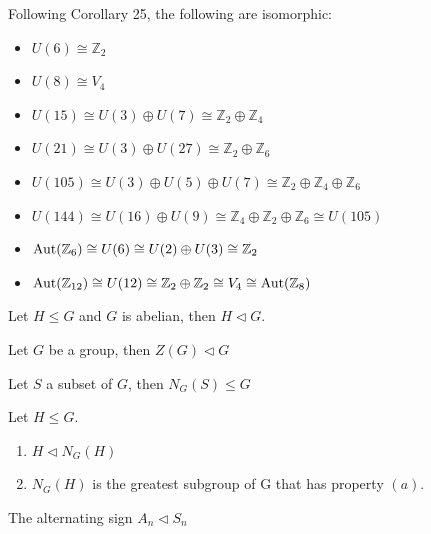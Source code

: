 \begin{assignment}[
  header=HeaderA,
  body=BodyA,
  title={Proved Proposition (Examples) in  Group Theory},
  duedate={\today},
  toc=false,
  toctitle={This appears on the Table of contents.},
  exlist=false
]
\begin{mprop}[25][][prop:25]
Following Corollary 25, the following are isomorphic:
\begin{itemize}
    \item $U(6) \cong \mathbb{Z}_2$
    \item $U(8) \cong V_4$
    \item $U(15) \cong U(3) \oplus U(7) \cong \mathbb{Z}_2 \oplus \mathbb{Z}_4$
    \item $U(21) \cong U(3) \oplus U(27) \cong \mathbb{Z}_2 \oplus \mathbb{Z}_6$
    \item $U(105) \cong U(3) \oplus U(5) \oplus U(7) \cong \mathbb{Z}_2 \oplus \mathbb{Z}_4 \oplus \mathbb{Z}_6$
    \item $U(144) \cong U(16)\oplus U(9) \cong \mathbb{Z}_4 \oplus \mathbb{Z}_2 \oplus \mathbb{Z}_6 \cong U(105)$
    \item $\mathrm{Aut}(\mathbb{Z}_6) \cong U(6) \cong U(2) \oplus U(3) \cong \mathbb{Z}_2$
    \item $\mathrm{Aut}(\mathbb{Z}_{12}) \cong U(12) \cong \mathbb{Z}_2 \oplus \mathbb{Z}_2 \cong V_4 \cong \mathrm{Aut}(\mathbb{Z}_8)$
\end{itemize}
\end{mprop}

\begin{mprop}[26][][prop:26]
Let $H \leq G$ and $G$ is abelian, then $H \lhd G$.
\end{mprop}

\begin{mprop}[27][][prop:27]
Let $G$ be a group, then $Z(G) \lhd G$
\end{mprop}

\begin{mprop}[28][][prop:28]
Let $S$ a subset of $G$, then $N_G(S) \leq G$
\end{mprop}

\begin{mprop}[29][][prop:29]
Let $H \leq G$.
\begin{enumerate}
    \item[a)] $H \lhd N_G(H)$
    \item[b)] $N_G(H)$ is the greatest subgroup of G that has property $(a)$.
\end{enumerate}
\end{mprop}

\begin{mprop}[30][][prop:30]
The alternating sign $A_n \lhd S_n$
\end{mprop}



\end{assignment}
